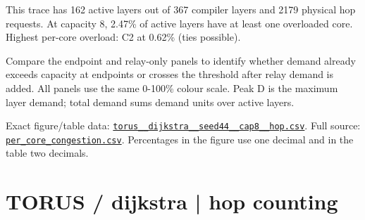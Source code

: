 \documentclass[10pt,a4paper]{article}
\begin{document}
This trace has 162 active layers out of 367 compiler layers and 2179 physical hop requests. At capacity 8, 2.47\% of active layers have at least one overloaded core. Highest per-core overload: C2 at 0.62\% (ties possible).\par
Compare the endpoint and relay-only panels to identify whether demand already exceeds capacity at endpoints or crosses the threshold after relay demand is added. All panels use the same 0-100\% colour scale. Peak D is the maximum layer demand; total demand sums demand units over active layers.\par
Exact figure/table data: \href{\detokenize{file:///home/dhruv-pansuriya/Documents/BTP/Compiler-Driven-ACE/output/pdf/qaoa_methods_congestion/tables/torus__dijkstra__seed44__cap8__hop.csv}}{\nolinkurl{torus__dijkstra__seed44__cap8__hop.csv}}. Full source: \href{\detokenize{file:///home/dhruv-pansuriya/Documents/BTP/Compiler-Driven-ACE/results/qaoa_2seed_2026-10-26/congestion/per_core_congestion.csv}}{\nolinkurl{per_core_congestion.csv}}. Percentages in the figure use one decimal and in the table two decimals.\par
\clearpage
\section*{TORUS / dijkstra | hop counting}
\end{document}
